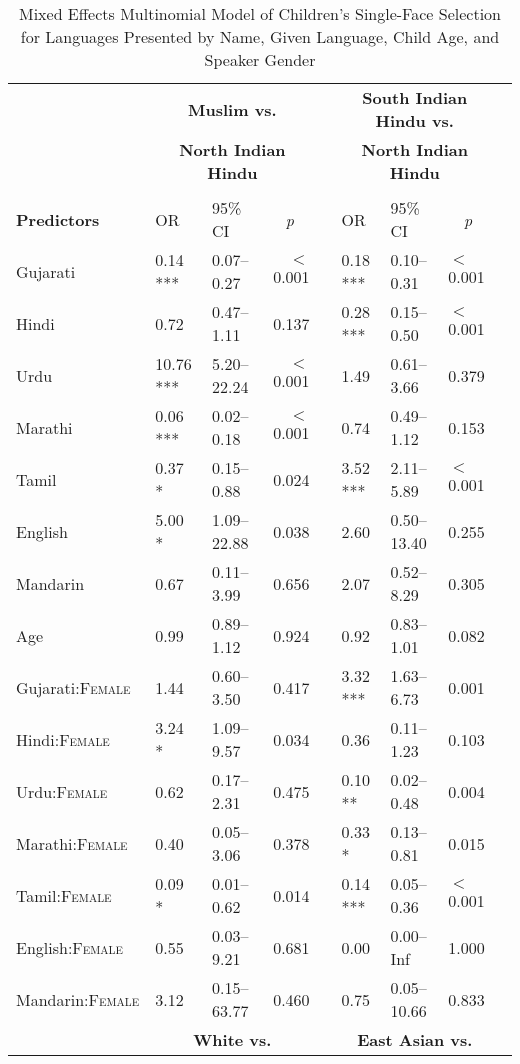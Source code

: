 \begin{table}[ht]
\small
\caption{Mixed Effects Multinomial Model of Children's Single-Face Selection for Languages Presented by Name, Given Language, Child Age, and Speaker Gender}\label{tab:fl-gen-mod}
    \centering
    \vspace{5pt}
    \setlength{\tabcolsep}{1.75pt} 
\begin{threeparttable}
\begin{tabular}{lllrllllr}
\toprule
& \multicolumn{3}{c}{\textbf{Muslim vs.}} & & \multicolumn{3}{c}{\textbf{South Indian Hindu vs.}}\\
& \multicolumn{3}{c}{\textbf{North Indian Hindu}\tnote{a}} & & \multicolumn{3}{c}{\textbf{North Indian Hindu}\tnote{a}}\\
\cline{2-4} \cline{6-8} \\[-.75em]
\textbf{Predictors} & OR & 95\% CI & \multicolumn{1}{c}{\textit{p}} & & OR & 95\% CI & \multicolumn{1}{c}{\textit{p}} \\ 
\midrule
Gujarati & 0.14 *** & 0.07--0.27 & $<$0.001 &  & 0.18 *** & 0.10--0.31 & $<$0.001 \\ 
  Hindi & 0.72 & 0.47--1.11 & 0.137 &  & 0.28 *** & 0.15--0.50 & $<$0.001 \\ 
  Urdu & 10.76 *** & 5.20--22.24 & $<$0.001 &  & 1.49 & 0.61--3.66 & 0.379 \\ 
  Marathi & 0.06 *** & 0.02--0.18 & $<$0.001 &  & 0.74 & 0.49--1.12 & 0.153 \\ 
  Tamil & 0.37 * & 0.15--0.88 & 0.024 &  & 3.52 *** & 2.11--5.89 & $<$0.001 \\ 
  English & 5.00 * & 1.09--22.88 & 0.038 &  & 2.60 & 0.50--13.40 & 0.255 \\ 
  Mandarin & 0.67 & 0.11--3.99 & 0.656 &  & 2.07 & 0.52--8.29 & 0.305 \\ 
  Age\tnote{b} & 0.99 & 0.89--1.12 & 0.924 &  & 0.92 & 0.83--1.01 & 0.082 \\ 
  Gujarati:\textsc{Female} & 1.44 & 0.60--3.50 & 0.417 &  & 3.32 *** & 1.63--6.73 & 0.001 \\ 
  Hindi:\textsc{Female}   & 3.24 * & 1.09--9.57 & 0.034 &  & 0.36 & 0.11--1.23 & 0.103 \\ 
  Urdu:\textsc{Female}   & 0.62 & 0.17--2.31 & 0.475 &  & 0.10 ** & 0.02--0.48 & 0.004 \\ 
  Marathi:\textsc{Female}   & 0.40 & 0.05--3.06 & 0.378 &  & 0.33 * & 0.13--0.81 & 0.015 \\ 
  Tamil:\textsc{Female}   & 0.09 * & 0.01--0.62 & 0.014 &  & 0.14 *** & 0.05--0.36 & $<$0.001 \\ 
  English:\textsc{Female}   & 0.55 & 0.03--9.21 & 0.681 &  & 0.00 & 0.00--Inf & 1.000 \\ 
  Mandarin:\textsc{Female}   & 3.12 & 0.15--63.77 & 0.460 &  & 0.75 & 0.05--10.66 & 0.833 \\ 
  \midrule
& 
\multicolumn{3}{c}{\textbf{White vs.}} & &
\multicolumn{3}{c}{\textbf{East Asian vs.}}\\


\end{tabular}
\end{threeparttable}
\end{table}
